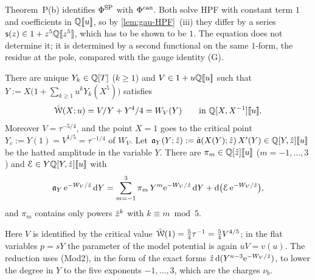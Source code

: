 
Theorem~P(b) identifies $\Phi^{\mathrm{SP}}$ with $\Phi^{\mathrm{can}}$. Both solve HPF with constant term $1$ and coefficients in $\mathbb{Q}[\![ u ]\!]$, so by \cref{lem:gau-HPF}~(iii) they differ by a series $\mathsf s(z)\in1+z^5\mathbb{Q}[\![ z^5 ]\!]$, which has to be shown to be $1$. The equation does not determine it; it is determined by a second functional on the same $1$-form, the residue at the pole, compared with the gauge identity (G).

\begin{lem}
\label{lem:con-cfu}
There are unique $Y_k\in\mathbb{Q}[T]$ ($k\geq1$) and $V\in1+u\mathbb{Q}[\![ u ]\!]$ such that $Y:=X\bigl(1+\sum_{k\geq1}u^kY_k(X^5)\bigr)$ satisfies
\[
\hat{\mathcal{W}}(X;u)=V/Y+Y^4/4=W_V(Y)\qquad\text{in }\mathbb{Q}[X,X^{-1}][\![ u ]\!].
\]
Moreover $V=\tau^{-5/4}$, and the point $X=1$ goes to the critical point $Y_c:=Y(1)=V^{1/5}=\tau^{-1/4}$ of $W_V$. Let $\mathfrak{a}_Y(Y;\hat{z}):=\hat{\mathfrak{a}}(X(Y);\hat{z})\,X'(Y)\in\mathbb{Q}[Y,\hat{z}][\![ u ]\!]$ be the hatted amplitude in the variable $Y$. There are $\pi_m\in\mathbb{Q}[\hat{z}][\![ u ]\!]$ ($m=-1,\dots,3$) and $\mathcal E\in Y\mathbb{Q}[Y,\hat{z}][\![ u ]\!]$ with
\[
\mathfrak{a}_Y\,\mathrm{e}^{-W_V/\hat{z}}\,\mathrm{d} Y=\sum_{m=-1}^{3}\pi_m\,Y^m\mathrm{e}^{-W_V/\hat{z}}\,\mathrm{d} Y+\mathrm{d}\bigl(\mathcal E\,\mathrm{e}^{-W_V/\hat{z}}\bigr),
\]
and $\pi_m$ contains only powers $\hat{z}^k$ with $k\equiv m\bmod5$.
\end{lem}

Here $V$ is identified by the critical value $\hat{\mathcal{W}}(1)=\frac54\tau^{-1}=\frac54V^{4/5}$; in the flat variables $p=sY$ the parameter of the model potential is again $uV=v(u)$. The reduction uses (Mod2), in the form of the exact forms $\hat{z}\,\mathrm{d}(Y^{n-3}\mathrm{e}^{-W_V/\hat{z}})$, to lower the degree in $Y$ to the five exponents $-1,\dots,3$, which are the charges $\nu_b$.

